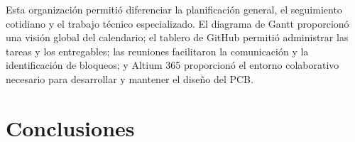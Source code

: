 \documentclass[journal,trans]{IEEEtran}
\begin{document}
Esta organización permitió diferenciar la planificación general, el seguimiento cotidiano y el trabajo técnico especializado. El diagrama de Gantt proporcionó una visión global del calendario; el tablero de GitHub permitió administrar las tareas y los entregables; las reuniones facilitaron la comunicación y la identificación de bloqueos; y Altium 365 proporcionó el entorno colaborativo necesario para desarrollar y mantener el diseño del PCB.





\section{Conclusiones}
\end{document}
